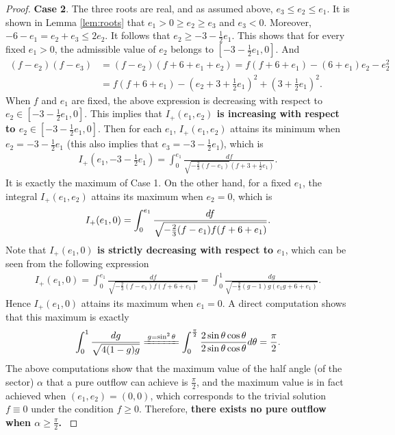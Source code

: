 \documentclass[reqno,12pt]{amsart}
\begin{document}
\begin{proof}
\vspace{3mm}
 {\bf Case 2}. The three roots are real, and as assumed above, $e_3 \leq e_2 \leq e_1$. 
 It is shown in Lemma \ref{lem:roots} that $e_1>0 \geq  e_2 \geq e_3$ and $e_3<0$. 
 Moreover, $-6-e_1= e_2+e_3 \leq 2e_2$. It follows that 
$ e_2 \geq -3- \frac12 e_1$.
This shows that for every fixed $e_1>0$, the admissible value of $e_2$ belongs to $ [-3- \frac12 e_1, 0]$. And
\begin{align*}
    (f-e_2) (f-e_3) &= (f-e_2) (f+ 6 + e_1 + e_2) = f(f+6+ e_1)-(6+ e_1) e_2 -e_2^2\\
    &= f(f+6+ e_1)-\left(e_2+3+ \frac12 e_1\right)^2 +  \left(3+ \frac12 e_1\right)^2.
\end{align*}
When $f$ and $e_1$ are fixed,
 the above expression is decreasing with respect to $e_2\in [-3- \frac12 e_1,0]$.
This implies that {\bf{$I_{+}(e_1, e_2)$ is increasing  with respect to $e_2\in [-3- \frac12 e_1,0]$}}.
Then for each $e_1$,
$I_{+}(e_1, e_2)$ attains its minimum when  $e_2 = -3- \frac12 e_1$ (this also implies that $e_3 = -3- \frac12 e_1$), which is 
\begin{align*}
    I_{+}\left(e_1, -3 - \frac12 e_1\right)= \int_0^{e_1} \frac{df }{\sqrt{-\frac23 (f-e_1)} (f+3 +\frac12 e_1)}. 
\end{align*}
It is exactly the maximum of Case 1. 
On the other hand, for a fixed $e_1$, the integral $I_{+}(e_1, e_2)$ attains its maximum when $e_2 =0$, which is 
\begin{align}\label{eq: I_{+}(e_1, 0)}
  I_{+}(e_1, 0)=  \int_0^{e_1} \frac{df}{\sqrt{-\frac23 (f- e_1) f (f+6 + e_1)}} . 
\end{align}
Note that \textbf{$I_{+}(e_1, 0)$ is  strictly decreasing with respect to $e_1$}, which can be seen from the following expression
\begin{align*}
   I_{+}(e_1, 0) =  \int_0^{e_1} \frac{df}{\sqrt{-\frac23 (f-e_1)f (f+ 6 + e_1)}}
    = \int_0^1 \frac{dg}{\sqrt{-\frac23 (g-1) g (e_1 g + 6 + e_1)}}. 
\end{align*}
Hence $I_{+}(e_1, 0)$ attains its maximum when $e_1 = 0$. A direct computation shows that this maximum is exactly 
\begin{equation}\label{eq:maxi0.5pi}
    \int_0^1 \frac{dg}{\sqrt{4(1-g) g}} \xlongequal {g=\sin^2\theta} \int_{0}^{\frac{\pi}{2}} \frac{2\sin \theta \cos \theta}{2\sin \theta \cos \theta} d\theta = \frac{\pi}{2}.
\end{equation}
The above computations show that the maximum value of the half angle (of the sector) $\alpha$ that a pure outflow can achieve is $\frac{\pi}{2}$, and the maximum value is in fact achieved when $(e_1,e_2)=(0,0)$, which corresponds to the trivial solution $f\equiv 0$ under the condition $f\geq 0$. Therefore, { \bf there exists no pure outflow when $\alpha\geq \frac{\pi}{2}$. }  
\end{proof}
\end{document}
